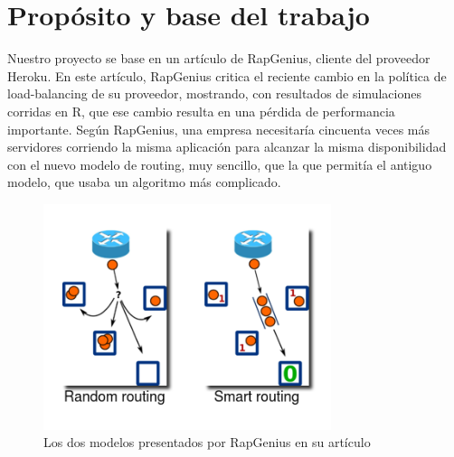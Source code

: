 \section{Propósito y base del trabajo}

Nuestro proyecto se base en un artículo de RapGenius, cliente del proveedor
Heroku. En este artículo, RapGenius critica el reciente cambio en la política
de load-balancing de su proveedor, mostrando, con resultados de simulaciones
corridas en R, que ese cambio resulta en una pérdida de performancia
importante. Según RapGenius, una empresa necesitaría cincuenta veces más
servidores corriendo la misma aplicación para alcanzar la misma disponibilidad
con el nuevo modelo de routing, muy sencillo, que la que permitía el antiguo
modelo, que usaba un algoritmo más complicado.

\begin{figure}[h]
    \centering
    \includegraphics[height=250px]{random-smart.png}
    \caption{Los dos modelos presentados por RapGenius en su artículo}
    \label{fig:random+smart}
\end{figure}

